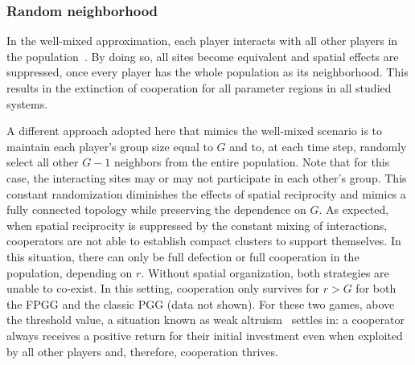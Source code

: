 \documentclass[5p,review]{elsarticle}
\begin{document}
\subsubsection*{Random neighborhood}
\label{sec.random}

In the well-mixed approximation, each player interacts with all other players in the population~\cite{Szabo2007}.
%
By doing so, all sites become equivalent and spatial effects are suppressed, once every player has the whole population as its neighborhood. This results in the extinction of cooperation for all parameter regions in all studied systems.
%


A different approach adopted here that mimics the well-mixed scenario is to maintain each player's group size equal to $G$ and to, at each time step, randomly select all other $G-1$ neighbors from the entire population. Note that for this case, the interacting sites may or may not participate in each other's group. 
%
This constant randomization diminishes the effects of spatial reciprocity and mimics a fully connected topology while preserving the dependence on $G$. 
%
As expected, when spatial reciprocity is suppressed by the constant mixing of interactions, cooperators are not able to establish compact clusters to support themselves. In this situation, there can only be full defection or full cooperation in the population, depending on $r$. Without spatial organization, both strategies are unable to co-exist.
%
In this setting, cooperation only survives for $r>G$ for both the FPGG and the classic PGG (data not shown).
%
For these two games, above the threshold value, a situation known as weak altruism~\cite{Wardil2017, Wilson1990} settles in: a cooperator always receives a positive return for their initial investment even when exploited by all other players and, therefore, cooperation thrives.
%
\end{document}
